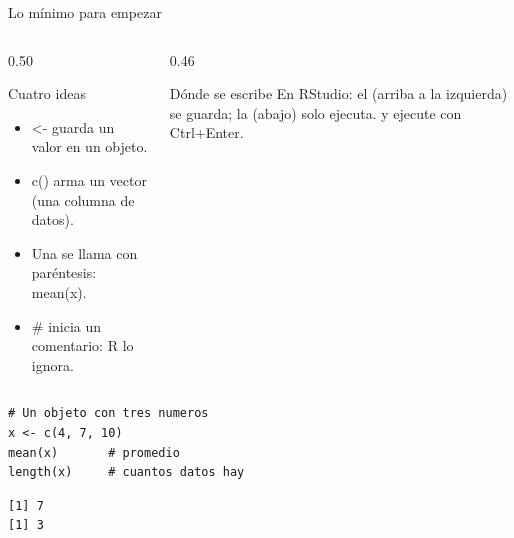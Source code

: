 \documentclass[aspectratio=169,10pt]{beamer}
\newcommand{\fx}[1]{{\ttfamily\color{uniAzul}#1}}
\begin{document}
\begin{frame}[fragile]{Lo mínimo para empezar}
  \footnotesize
  \begin{columns}[T,onlytextwidth]
    \begin{column}{0.50\textwidth}
      \begin{block}{Cuatro ideas}
        \tiny
        \begin{itemize}\setlength{\itemsep}{-0.05cm}
          \item \fx{<-} guarda un valor en un objeto.
          \item \fx{c()} arma un vector (una columna de datos).
          \item Una  se llama con paréntesis:
                \fx{mean(x)}.
          \item \fx{\#} inicia un comentario: R lo ignora.
        \end{itemize}
      \end{block}
    \end{column}
    \begin{column}{0.46\textwidth}
      \begin{alertblock}{Dónde se escribe}
        \tiny
        En RStudio: el  (arriba a la izquierda) se guarda; la
         (abajo) solo ejecuta.  y ejecute con Ctrl+Enter.
      \end{alertblock}
    \end{column}
  \end{columns}

  \vspace{0.05cm}
\begin{lstlisting}[style=Rcode]
# Un objeto con tres numeros
x <- c(4, 7, 10)
mean(x)       # promedio
length(x)     # cuantos datos hay
\end{lstlisting}
\begin{lstlisting}[style=Rout]
[1] 7
[1] 3
\end{lstlisting}
\end{frame}

\end{document}
